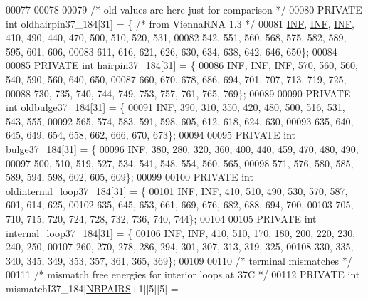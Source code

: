 \begin{DoxyCode}
00077 
00078 
00079 \textcolor{comment}{/* old values are here just for comparison */}
00080 PRIVATE \textcolor{keywordtype}{int} oldhairpin37\_184[31] = \{ \textcolor{comment}{/* from ViennaRNA 1.3 */}
00081   \hyperlink{constants_8h_a12c2040f25d8e3a7b9e1c2024c618cb6}{INF}, \hyperlink{constants_8h_a12c2040f25d8e3a7b9e1c2024c618cb6}{INF}, \hyperlink{constants_8h_a12c2040f25d8e3a7b9e1c2024c618cb6}{INF}, 410, 490, 440, 470, 500, 510, 520, 531,
00082        542, 551, 560, 568, 575, 582, 589, 595, 601, 606,
00083        611, 616, 621, 626, 630, 634, 638, 642, 646, 650\};
00084 
00085 PRIVATE \textcolor{keywordtype}{int} hairpin37\_184[31] = \{
00086   \hyperlink{constants_8h_a12c2040f25d8e3a7b9e1c2024c618cb6}{INF}, \hyperlink{constants_8h_a12c2040f25d8e3a7b9e1c2024c618cb6}{INF}, \hyperlink{constants_8h_a12c2040f25d8e3a7b9e1c2024c618cb6}{INF}, 570, 560, 560, 540, 590, 560, 640, 650,
00087        660, 670, 678, 686, 694, 701, 707, 713, 719, 725,
00088        730, 735, 740, 744, 749, 753, 757, 761, 765, 769\};
00089 
00090 PRIVATE \textcolor{keywordtype}{int} oldbulge37\_184[31] = \{
00091   \hyperlink{constants_8h_a12c2040f25d8e3a7b9e1c2024c618cb6}{INF}, 390, 310, 350, 420, 480, 500, 516, 531, 543, 555,
00092        565, 574, 583, 591, 598, 605, 612, 618, 624, 630,
00093        635, 640, 645, 649, 654, 658, 662, 666, 670, 673\};
00094 
00095 PRIVATE \textcolor{keywordtype}{int} bulge37\_184[31] = \{
00096   \hyperlink{constants_8h_a12c2040f25d8e3a7b9e1c2024c618cb6}{INF}, 380, 280, 320, 360, 400, 440, 459, 470, 480, 490,
00097        500, 510, 519, 527, 534, 541, 548, 554, 560, 565,
00098   571, 576, 580, 585, 589, 594, 598, 602, 605, 609\};
00099 
00100 PRIVATE \textcolor{keywordtype}{int} oldinternal\_loop37\_184[31] = \{
00101   \hyperlink{constants_8h_a12c2040f25d8e3a7b9e1c2024c618cb6}{INF}, \hyperlink{constants_8h_a12c2040f25d8e3a7b9e1c2024c618cb6}{INF}, 410, 510, 490, 530, 570, 587, 601, 614, 625,
00102        635, 645, 653, 661, 669, 676, 682, 688, 694, 700,
00103        705, 710, 715, 720, 724, 728, 732, 736, 740, 744\};
00104 
00105 PRIVATE \textcolor{keywordtype}{int} internal\_loop37\_184[31] = \{
00106   \hyperlink{constants_8h_a12c2040f25d8e3a7b9e1c2024c618cb6}{INF}, \hyperlink{constants_8h_a12c2040f25d8e3a7b9e1c2024c618cb6}{INF}, 410, 510, 170, 180, 200, 220, 230, 240, 250,
00107        260, 270, 278, 286, 294, 301, 307, 313, 319, 325,
00108        330, 335, 340, 345, 349, 353, 357, 361, 365, 369\};
00109 
00110 \textcolor{comment}{/* terminal mismatches */}
00111 \textcolor{comment}{/* mismatch free energies for interior loops at 37C */}
00112 PRIVATE \textcolor{keywordtype}{int} mismatchI37\_184[\hyperlink{constants_8h_a5e75221c779d618eab81e096f37e32ce}{NBPAIRS}+1][5][5] =

\end{DoxyCode}
